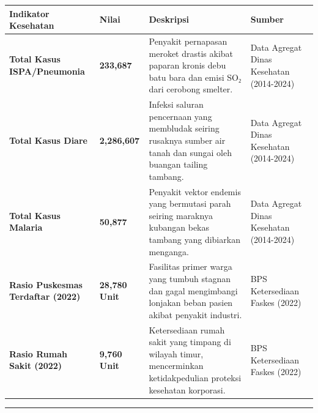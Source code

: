 \documentclass[
]{article}
\newcounter{none} %
\begin{document}
{\def\LTcaptype{none} %
\begin{longtable}[]{@{}
  >{\raggedright\arraybackslash}p{}
  >{\raggedright\arraybackslash}p{}
  >{\raggedright\arraybackslash}p{}
  >{\raggedright\arraybackslash}p{}@{}}
\toprule\noalign{}
\begin{minipage}[b]{\linewidth}\raggedright
Indikator Kesehatan
\end{minipage} & \begin{minipage}[b]{\linewidth}\raggedright
Nilai
\end{minipage} & \begin{minipage}[b]{\linewidth}\raggedright
Deskripsi
\end{minipage} & \begin{minipage}[b]{\linewidth}\raggedright
Sumber
\end{minipage} \\
\midrule\noalign{}
\endhead
\bottomrule\noalign{}
\endlastfoot
\textbf{Total Kasus ISPA/Pneumonia} & \textbf{233,687} & Penyakit
pernapasan meroket drastis akibat paparan kronis debu batu bara dan
emisi SO₂ dari cerobong smelter. & Data Agregat Dinas Kesehatan
(2014-2024) \\
\textbf{Total Kasus Diare} & \textbf{2,286,607} & Infeksi saluran
pencernaan yang membludak seiring rusaknya sumber air tanah dan sungai
oleh buangan tailing tambang. & Data Agregat Dinas Kesehatan
(2014-2024) \\
\textbf{Total Kasus Malaria} & \textbf{50,877} & Penyakit vektor endemis
yang bermutasi parah seiring maraknya kubangan bekas tambang yang
dibiarkan menganga. & Data Agregat Dinas Kesehatan (2014-2024) \\
\textbf{Rasio Puskesmas Terdaftar (2022)} & \textbf{28,780 Unit} &
Fasilitas primer warga yang tumbuh stagnan dan gagal mengimbangi
lonjakan beban pasien akibat penyakit industri. & BPS Ketersediaan
Faskes (2022) \\
\textbf{Rasio Rumah Sakit (2022)} & \textbf{9,760 Unit} & Ketersediaan
rumah sakit yang timpang di wilayah timur, mencerminkan ketidakpedulian
proteksi kesehatan korporasi. & BPS Ketersediaan Faskes (2022) \\
\end{longtable}
}

\begin{center}\rule{0.5\linewidth}{0.5pt}\end{center}
\end{document}
